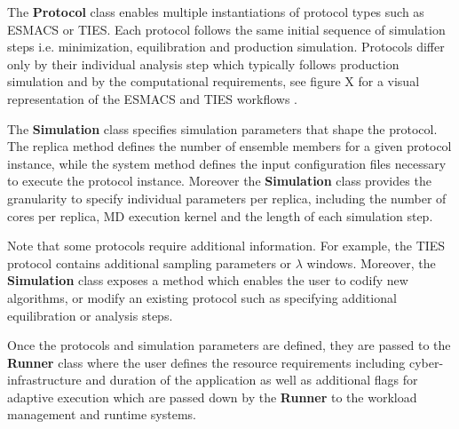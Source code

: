 The \textbf{Protocol} class  enables multiple instantiations of protocol types such as
ESMACS or TIES. Each protocol follows the same initial sequence of simulation
steps i.e. minimization, equilibration and production simulation. Protocols differ only by their
individual analysis step which typically follows production simulation and by
the computational requirements, see figure X for a visual representation of
the ESMACS and TIES workflows .

The \textbf{Simulation} class  specifies simulation parameters that shape the
protocol. The replica method defines the number of ensemble members for a
given protocol instance, while the system method defines the input
configuration files necessary to execute the protocol instance. Moreover the
\textbf{Simulation} class provides the granularity to specify individual
parameters per replica, including the number of cores per replica, MD
execution kernel and the length of each simulation step.

Note that some protocols require additional information. For example, the
TIES protocol contains additional sampling parameters or $\lambda$ windows.
Moreover, the \textbf{Simulation} class exposes a method which enables the
user to codify new algorithms, or modify an existing protocol such as
specifying additional equilibration or analysis steps.

Once the protocols and simulation parameters are defined, they are passed to
the \textbf{Runner} class where the user defines the resource requirements
including cyber-infrastructure and duration of the application as well as
additional flags for adaptive execution which are passed down by the
\textbf{Runner} to the workload management and runtime systems.


